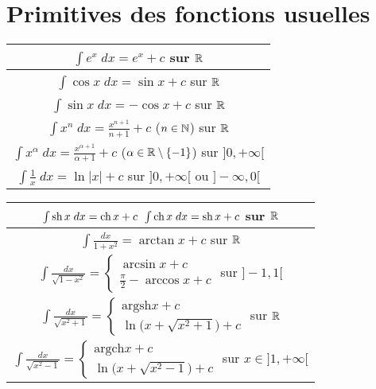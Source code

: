 \section*{Primitives des fonctions usuelles}


\begin{frame}
\begin{center}
\setlength{\arrayrulewidth}{0.05mm}
\begin{tabular}{c@{\vrule depth 3ex height 4ex width 0mm \ }}  
\hline
   $\int e^x \; dx  = e^x + c$  \quad sur $\mathbb{R}$ \\ \hline
\pause
   $\int \cos x \; dx  = \sin x  + c$  \quad sur $\mathbb{R}$ \\ \hline
\pause
   $\int \sin x \; dx  = -\cos x  + c$  \quad sur $\mathbb{R}$ \\ \hline
\pause
   $\int x^n \; dx = \frac{x^{n+1}}{n+1} + c$  \quad ($n \in \mathbb{N}$)  \quad sur $\mathbb{R}$ \\ \hline
\pause
   $\int x^\alpha \; dx = \frac{x^{\alpha+1}}{\alpha+1} + c$  \quad ($\alpha \in \mathbb{R}\setminus\{-1\}$)  sur $]0,+\infty[$\\ \hline
\pause
   $\int \frac 1x \; dx  = \ln |x|  + c$  \quad sur $]0,+\infty[$ ou $]-\infty,0[$ \\ \hline
\end{tabular} 
\end{center}
\end{frame}



\begin{frame}

\begin{center}
\begin{tabular}{c@{\vrule depth 3ex height 4ex width 0mm \ }} 
\hline
 $\int\mathop{\text{sh}}\nolimits x \; dx=\mathop{\text{ch}}\nolimits x+c$ \quad  $\int \mathop{\text{ch}}\nolimits x \; dx=\mathop{\text{sh}}\nolimits x+c$ \quad sur $\mathbb{R}$ \\ \hline
\pause
   $\int \frac{dx}{1+x^2}= \arctan x+c$ \quad sur $\mathbb{R}$ \\ \hline
\pause
   $\int\frac{dx}{\sqrt{1-x^2}} = \left\{ \begin{array}{l}
   \arcsin x + c \\ \frac\pi2-\arccos x +c \end{array} \right.$ \quad  sur $]-1,1[$ \\ \hline
\pause
   $\int \frac{dx}{\sqrt {x^2+1}}=  \left\{ \begin{array}{l} \mbox{argsh} x+c \\
   \ln\big(x+\sqrt{x^2+1}\big)+c  \end{array} \right.$ \quad sur $\mathbb{R}$ \\ \hline
\pause
   $\int \frac{dx}{\sqrt {x^2-1}} = \left\{ \begin{array}{l} \mbox{argch} x+c \\ 
   \ln\big(x+\sqrt{x^2-1}\big)+c \end{array} \right.$ \quad sur $x\in ]1,+ \infty[$\\ \hline
\end{tabular} 
\end{center}

\end{frame}




